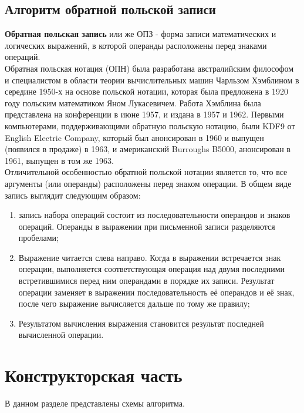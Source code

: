 \documentclass[a4paper, 12pt]{article}
\begin{document}
	\subsection{Алгоритм обратной польской записи}
	\hspace*{5mm} \textbf{Обратная польская запись} или же ОПЗ - форма записи математических и логических выражений, в которой операнды расположены перед знаками операций.\cite{opz} 
	\\ \hspace*{5mm}Обратная польская нотация (ОПН) была разработана австралийским философом и специалистом в области теории вычислительных машин Чарльзом Хэмблином в середине 1950-х на основе польской нотации, которая была предложена в 1920 году польским математиком Яном Лукасевичем. Работа Хэмблина была представлена на конференции в июне 1957, и издана в 1957 и 1962. Первыми компьютерами, поддерживающими обратную польскую нотацию, были KDF9 от English Electric Company, который был анонсирован в 1960 и выпущен (появился в продаже) в 1963, и американский Burroughs B5000, анонсирован в 1961, выпущен в том же 1963.
	\\ \hspace*{5mm} Отличительной особенностью обратной польской нотации является то, что все аргументы (или операнды) расположены перед знаком операции. В общем виде запись выглядит следующим образом:
	\begin{enumerate}
		\item запись набора операций состоит из последовательности операндов и знаков операций. Операнды в выражении при письменной записи разделяются пробелами;
		\item Выражение читается слева направо. Когда в выражении встречается знак операции, выполняется соответствующая операция над двумя последними встретившимися перед ним операндами в порядке их записи. Результат операции заменяет в выражении последовательность её операндов и её знак, после чего выражение вычисляется дальше по тому же правилу;
		\item Результатом вычисления выражения становится результат последней вычисленной операции.
	\end{enumerate}

\section{Конструкторская часть}
	\hspace*{5mm} В данном разделе представлены схемы алгоритма.
\end{document}

